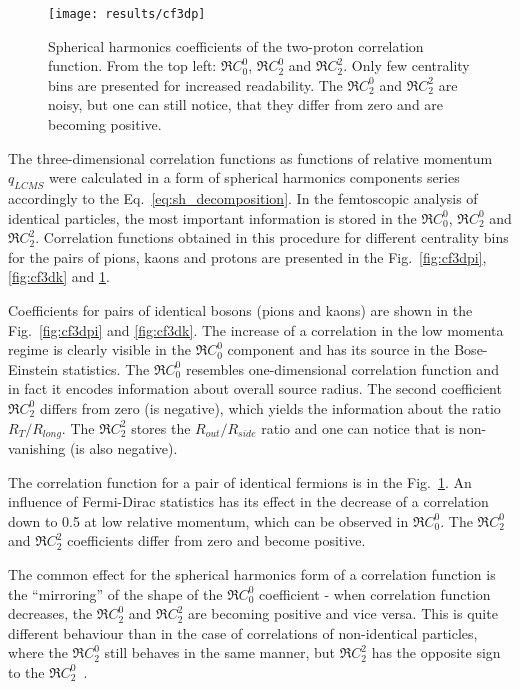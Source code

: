       \begin{figure}[b]
        \centering
        \centerline{\texttt{[image: results/cf3dp]}}
        \caption{Spherical harmonics coefficients of the two-proton correlation function. From the top left: $\Re C^0_0$, $\Re C^0_2$ and $\Re C^2_2$. Only few centrality bins are presented for increased readability. The $\Re C^0_2$ and $\Re C^2_2$ are noisy, but one can still notice, that they differ from zero and are becoming positive.}
      \label{fig:cf3dp}
      \end{figure}

      The three-dimensional correlation functions as functions of relative momentum $q_{LCMS}$ were calculated in a form of spherical harmonics components series accordingly to the Eq.~\ref{eq:sh_decomposition}.
      In the femtoscopic analysis of identical particles, the most important information is stored in the $\Re C^0_0$, $\Re C^0_2$ and $\Re C^2_2$.
      Correlation functions obtained in this procedure for different centrality bins for the pairs of pions, kaons and protons are presented in the Fig.~\ref{fig:cf3dpi}, \ref{fig:cf3dk} and \ref{fig:cf3dp}.
      
      Coefficients for pairs of identical bosons (pions and kaons) are shown in the Fig.~\ref{fig:cf3dpi} and \ref{fig:cf3dk}.
      The increase of a correlation in the low momenta regime is clearly visible in the $\Re C^0_0$ component and has its source in the Bose-Einstein statistics.
      The $\Re C_0^0$ resembles one-dimensional correlation function and in fact it encodes information about overall source radius.
      The second coefficient $\Re C^0_2$ differs from zero (is negative), which yields the information about the ratio $R_T / R_{long}$.
      The $\Re C^2_2$ stores the $R_{out} / R_{side}$ ratio and one can notice that is non-vanishing (is also negative).

      The correlation function for a pair of identical fermions is in the Fig.~\ref{fig:cf3dp}.
      An influence of Fermi-Dirac statistics has its effect in the decrease of a correlation down to 0.5 at low relative momentum, which can be observed in $\Re C^0_0$.
      The $\Re C^0_2$ and $\Re C^2_2$ coefficients differ from zero and become positive.

      The common effect for the spherical harmonics form of a correlation function is the ``mirroring'' of the shape of the $\Re C^0_0$ coefficient - when correlation function decreases, the $\Re C^0_2$ and $\Re C^2_2$ are becoming positive and vice versa.
      This is quite different behaviour than in the case of correlations of non-identical particles, where the $\Re C^0_2$ still behaves in the same manner, but $\Re C_2^2$ has the opposite sign to the $\Re C^0_2$~\cite{nonidfemto}.


